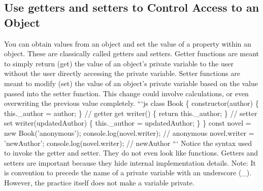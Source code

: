 \documentclass{article}%
\begin{document}
%
\subsection{Use getters and setters to Control Access to an Object}%
\label{subsec:UsegettersandsetterstoControlAccesstoanObject}%
You can obtain values from an object and set the value of a property within an object.\newline%
These are classically called getters and setters.\newline%
Getter functions are meant to simply return (get) the value of an object's private variable to the user without the user directly accessing the private variable.\newline%
Setter functions are meant to modify (set) the value of an object's private variable based on the value passed into the setter function. This change could involve calculations, or even overwriting the previous value completely.\newline%
```js\newline%
class Book \{\newline%
  constructor(author) \{\newline%
    this.\_author = author;\newline%
  \}\newline%
  // getter\newline%
  get writer() \{\newline%
    return this.\_author;\newline%
  \}\newline%
  // setter\newline%
  set writer(updatedAuthor) \{\newline%
    this.\_author = updatedAuthor;\newline%
  \}\newline%
\}\newline%
const novel = new Book('anonymous');\newline%
console.log(novel.writer);  // anonymous\newline%
novel.writer = 'newAuthor';\newline%
console.log(novel.writer);  // newAuthor\newline%
```\newline%
Notice the syntax used to invoke the getter and setter. They do not even look like functions.\newline%
Getters and setters are important because they hide internal implementation details.\newline%
Note: It is convention to precede the name of a private variable with an underscore (\_). However, the practice itself does not make a variable private.\newline%
\end{document}

